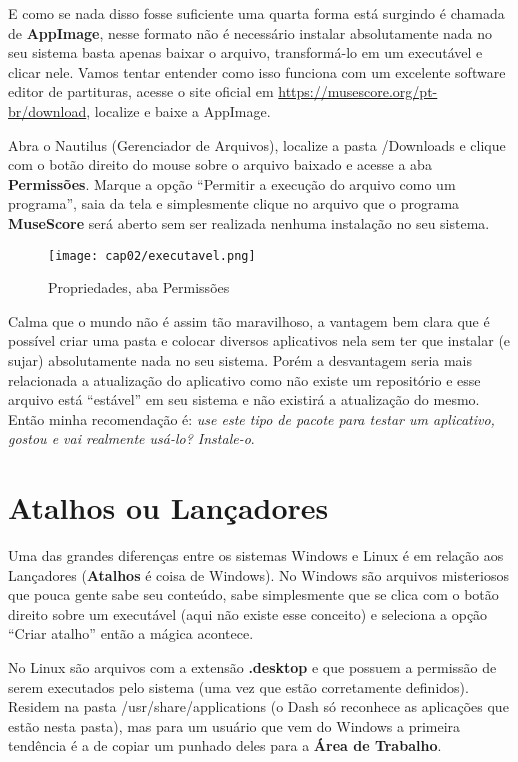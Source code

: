 E como se nada disso fosse suficiente uma quarta forma está surgindo é chamada de \textbf{AppImage}, nesse formato não é necessário instalar absolutamente nada no seu sistema basta apenas baixar o arquivo, transformá-lo em um executável e clicar nele. Vamos tentar entender como isso funciona com um excelente software editor de partituras, acesse o site oficial em \url{https://musescore.org/pt-br/download}, localize e baixe a AppImage.

Abra o Nautilus (Gerenciador de Arquivos), localize a pasta /Downloads e clique com o botão direito do mouse sobre o arquivo baixado e acesse a aba \textbf{Permissões}. Marque a opção ``Permitir a execução do arquivo como um programa'', saia da tela e simplesmente clique no arquivo que o programa \textbf{MuseScore} será aberto sem ser realizada nenhuma instalação no seu sistema. 
\begin{figure}[H]
 \centering\texttt{[image: cap02/executavel.png]}
 \caption{Propriedades, aba Permissões}
\end{figure}

Calma que o mundo não é assim tão maravilhoso, a vantagem bem clara que é possível criar uma pasta e colocar diversos aplicativos nela sem ter que instalar (e sujar) absolutamente nada no seu sistema. Porém a desvantagem seria mais relacionada a atualização do aplicativo como não existe um repositório e esse arquivo está ``estável'' em seu sistema e não existirá a atualização do mesmo. Então minha recomendação é: \textit{use este tipo de pacote para testar um aplicativo, gostou e vai realmente usá-lo? Instale-o}.

\section{Atalhos ou Lançadores}
Uma das grandes diferenças entre os sistemas Windows e Linux é em relação aos Lançadores (\textbf{Atalhos} é coisa de Windows). No Windows são arquivos misteriosos que pouca gente sabe seu conteúdo, sabe simplesmente que se clica com o botão direito sobre um executável (aqui não existe esse conceito) e seleciona a opção ``Criar atalho'' então a mágica acontece. 

No Linux são arquivos com a extensão \textbf{.desktop} e que possuem a permissão de serem executados pelo sistema (uma vez que estão corretamente definidos). Residem na pasta /usr/share/applications (o Dash só reconhece as aplicações que estão nesta pasta), mas para um usuário que vem do Windows a primeira tendência é a de copiar um punhado deles para a \textbf{Área de Trabalho}.

